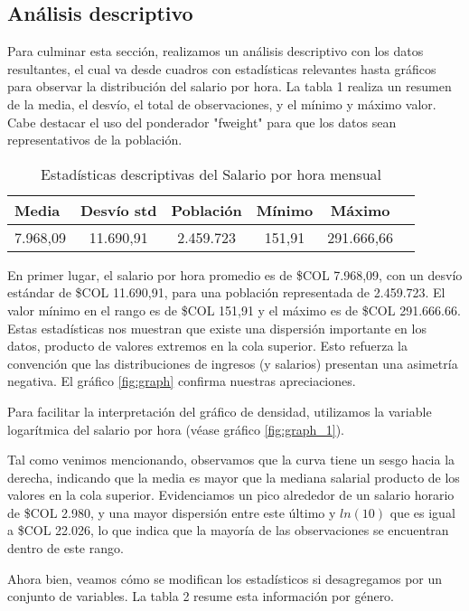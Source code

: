 \documentclass[11pt,oneside]{article}
\begin{document}
	\subsection{Análisis descriptivo}
	
	Para culminar esta sección, realizamos un análisis descriptivo con los datos resultantes, el cual va desde cuadros con estadísticas relevantes hasta gráficos para observar la distribución del salario por hora. La tabla 1 realiza un resumen de la media, el desvío, el total de observaciones, y el mínimo y máximo valor. Cabe destacar el uso del ponderador "fweight" para que los datos sean representativos de la población.
	
	\begin{table}[H]
\caption{Estadísticas descriptivas del Salario por hora mensual}
		\centering
		\begin{tabular}{lccccc}
			\hline
			\textbf{Media} & \textbf{Desvío std} & \textbf{Población} & \textbf{Mínimo} & \textbf{Máximo} \\ \hline
			7.968,09 & 11.690,91 & 2.459.723 & 151,91 & 291.666,66 \\ \hline
		\end{tabular}
		\label{tab:estadisticas}
	\end{table}
	
	En primer lugar, el salario por hora promedio es de \$COL 7.968,09, con un desvío estándar de \$COL 11.690,91, para una población representada de 2.459.723. El valor mínimo en el rango es de \$COL 151,91 y el máximo es de \$COL 291.666.66. Estas estadísticas nos muestran que existe una dispersión importante en los datos, producto de valores extremos en la cola superior. Esto refuerza la convención que las distribuciones de ingresos (y salarios) presentan una asimetría negativa. El gráfico \ref{fig:graph} confirma nuestras apreciaciones.
	
	Para facilitar la interpretación del gráfico de densidad, utilizamos la variable logarítmica del salario por hora (véase gráfico \ref{fig:graph_1}).
	
	Tal como venimos mencionando, observamos que la curva tiene un sesgo hacia la derecha, indicando que la media es mayor que la mediana salarial producto de los valores en la cola superior. Evidenciamos un pico alrededor de un salario horario de \$COL 2.980, y una mayor dispersión entre este último y $ln(10)$ que es igual a \$COL 22.026, lo que indica que la mayoría de las observaciones se encuentran dentro de este rango. 
	
	Ahora bien, veamos cómo se modifican los estadísticos si desagregamos por un conjunto de variables. La tabla 2 resume esta información por género. 
	
\end{document}
